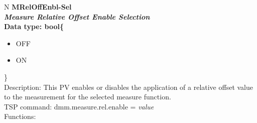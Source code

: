 \documentclass[openany]{article}
\begin{document}
		\begin{tabular}{N}
			\hline
			\bfseries MRelOffEnbl-Sel\label{pv:mreloffenbl-sel} \\ \hline
			\emph{Measure Relative Offset Enable Selection} \\
			Data type: bool\{\begin{itemize}[noitemsep]
				\small
				\item[] OFF
				\item[] ON
			\end{itemize}\} \\
			Description: This PV enables or disables the application of a relative offset value to the measurement for the selected measure function. \\
			TSP command: dmm.measure.rel.enable = \emph{value} \\
			Functions: \\
			\arrayrulecolor{\FuncTableBorderColor}

		\end{tabular}
\end{document}
